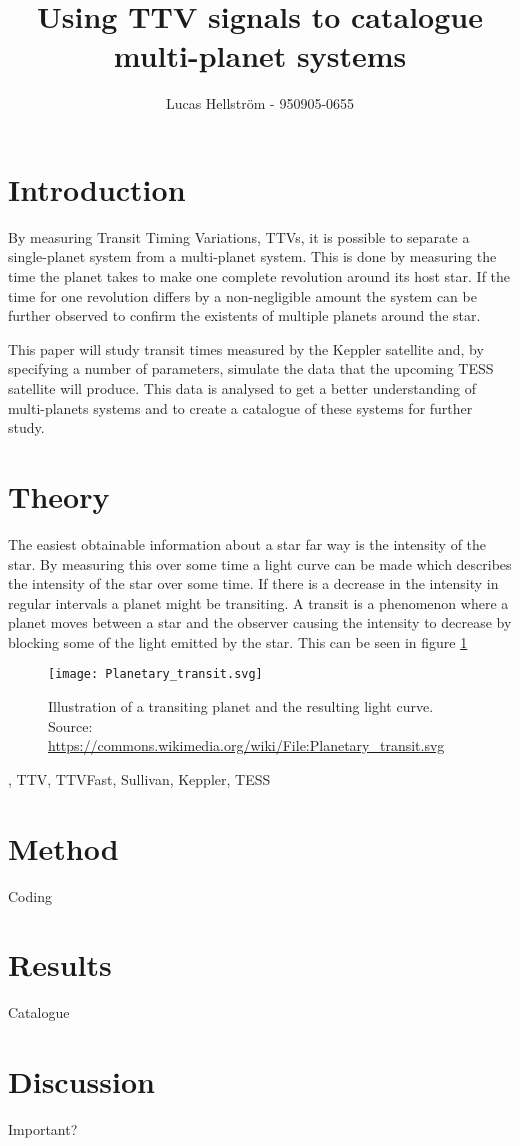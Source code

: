 \documentclass[titlepage]{article}
\title{Using TTV signals to catalogue multi-planet systems}
\author{Lucas Hellström - 950905-0655}
\date{}
\begin{document}
\maketitle

\section{Introduction}
	By measuring Transit Timing Variations, TTVs, it is possible to separate a single-planet system from a multi-planet system. This is done by measuring the time the planet takes to make one complete revolution around its host star. If the time for one revolution differs by a non-negligible amount the system can be further observed to confirm the existents of multiple planets around the star. 
	
	This paper will study transit times measured by the Keppler satellite and, by specifying a number of parameters, simulate the data that the upcoming TESS satellite will produce. This data is analysed to get a better understanding of multi-planets systems and to create a catalogue of these systems for further study. 
\section{Theory}
	The easiest obtainable information about a star far way is the intensity of the star. By measuring this over some time a light curve can be made which describes the intensity of the star over some time. If there is a decrease in the intensity in regular intervals a planet might be transiting. A transit is a phenomenon where a planet moves between a star and the observer causing the intensity to decrease by blocking some of the light emitted by the star. This can be seen in figure \ref{fig:trans}
	
	\begin{figure}[h!]
		\centering
		\captionsetup{justification=centering}
		\texttt{[image: Planetary\_transit.svg]}
		\caption{Illustration of a transiting planet and the resulting light curve. \\  \small{ Source: \url{https://commons.wikimedia.org/wiki/File:Planetary_transit.svg}}}
		\label{fig:trans}
	\end{figure}
	, TTV, TTVFast, Sullivan, Keppler, TESS
\section{Method}
	Coding
\section{Results}
	Catalogue
\section{Discussion}
	Important?
\end{document}
